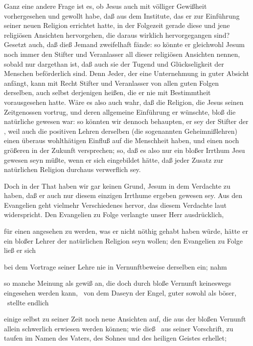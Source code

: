 \begin{aufza}
\item Ganz eine andere Frage ist es, ob Jesus auch mit völliger Gewißheit vorhergesehen und gewollt habe, daß aus dem Institute, das er zur Einführung seiner neuen Religion errichtet hatte, in der Folgezeit gerade diese und jene religiösen Ansichten hervorgehen, die daraus wirklich hervorgegangen sind? Gesetzt auch, daß dieß Jemand zweifelhaft fände: so könnte er gleichwohl Jesum noch immer den Stifter und Veranlasser all dieser religiösen Ansichten nennen, sobald nur dargethan ist, daß auch sie der Tugend und Glückseligkeit der Menschen beförderlich sind. Denn Jeder, der eine Unternehmung in guter Absicht anfängt, kann mit Recht Stifter und Veranlasser von allen guten Folgen derselben, auch selbst derjenigen heißen, die er nie mit Bestimmtheit vorausgesehen hatte. Wäre es also auch wahr, daß die Religion, die Jesus seinen Zeitgenossen vortrug, und deren allgemeine Einführung er wünschte, bloß die natürliche gewesen war: so könnten wir dennoch behaupten, er sey der Stifter der , weil auch die positiven Lehren derselben (die sogenannten Geheimnißlehren) einen überaus wohlthätigen Einfluß auf die Menschheit haben, und einen noch größeren in der Zukunft versprechen; so, daß es also nur ein bloßer Irrthum Jesu gewesen seyn müßte, wenn er sich eingebildet hätte, daß jeder Zusatz zur natürlichen Religion durchaus verwerflich sey.
\item Doch in der That haben wir gar keinen Grund, Jesum in dem Verdachte zu haben, daß er auch nur diesem einzigen Irrthume ergeben gewesen sey. Aus den Evangelien geht vielmehr Verschiedenes hervor, das diesem Verdachte laut widerspricht. Den Evangelien zu Folge verlangte unser Herr ausdrücklich,
\begin{aufzb}
\item für einen  angesehen zu werden, was er nicht nöthig gehabt haben würde, hätte er ein bloßer Lehrer der natürlichen Religion seyn wollen; den Evangelien zu Folge ließ er sich~
\item bei dem Vortrage seiner Lehre nie in Vernunftbeweise derselben ein; nahm
\item so manche Meinung als gewiß an, die doch durch bloße Vernunft keineswegs eingesehen werden kann, \zB\ von dem Daseyn der Engel, guter sowohl als böser, \usw\ stellte endlich
\item einige selbst zu seiner Zeit noch neue Ansichten auf, die aus der bloßen Vernunft allein schwerlich erwiesen werden können; wie dieß \zB\ aus seiner Vorschrift, zu taufen im Namen des Vaters, des Sohnes und des heiligen Geistes erhellet; \usw\
\end{aufzb}
\end{aufza}


